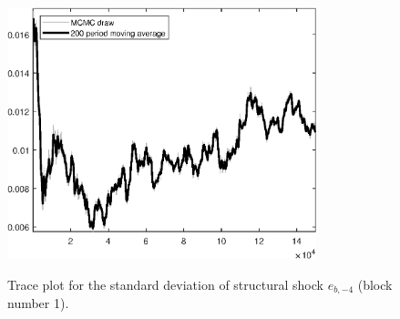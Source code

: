 \begin{figure}[H]
\centering
  \includegraphics[width=0.8\textwidth]{BRS_sectoral_wo_gmf/graphs/TracePlot_SE_e_b_news_blck_1}\\
    \caption{Trace plot for the standard deviation of structural shock ${e_{b,-4}}$ (block number 1).}
\end{figure}
